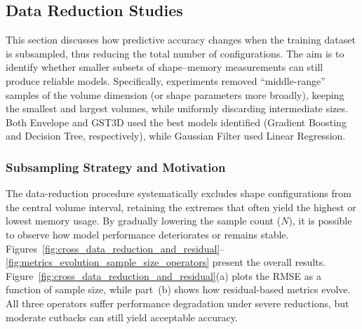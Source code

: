 \subsection{Data Reduction Studies}
\label{subsec:pmc-results-data-reduction-studies}


This section discusses how predictive accuracy changes when the training dataset is subsampled, thus reducing the total number of configurations.
The aim is to identify whether smaller subsets of shape–memory measurements can still produce reliable models.
Specifically, experiments removed “middle-range” samples of the volume dimension (or shape parameters more broadly), keeping the smallest and largest volumes, while uniformly discarding intermediate sizes.
Both Envelope and \ac{GST3D} used the best models identified (Gradient Boosting and Decision Tree, respectively), while Gaussian Filter used Linear Regression.


\subsubsection{Subsampling Strategy and Motivation}
\label{subsec:data-reduction-strategy-and-motivation}

The data-reduction procedure systematically excludes shape configurations from the central volume interval, retaining the extremes that often yield the highest or lowest memory usage.
By gradually lowering the sample count (\(N\)), it is possible to observe how model performance deteriorates or remains stable.
Figures~\ref{fig:cross_data_reduction_and_residual}--\ref{fig:metrics_evolution_sample_size_operators} present the overall results.
Figure~\ref{fig:cross_data_reduction_and_residual}(a) plots the \ac{RMSE} as a function of sample size, while part~(b) shows how residual-based metrics evolve.
All three operators suffer performance degradation under severe reductions, but moderate cutbacks can still yield acceptable accuracy.

